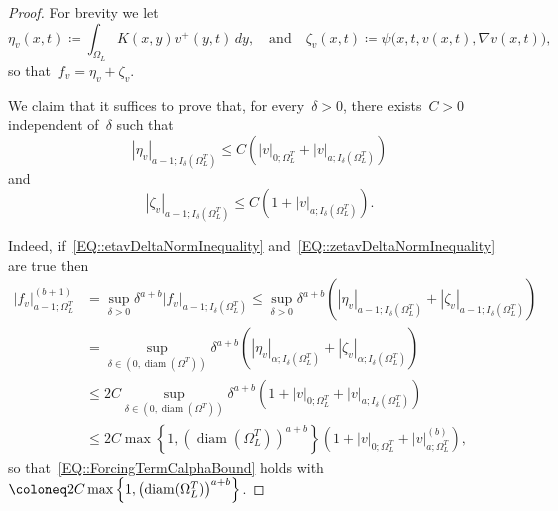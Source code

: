 \documentclass[12pt,a4paper]{amsart}
\makeatletter
\numberwithin{equation}{section}
\theoremstyle{definition}
\theoremstyle{remark}
\newcommand{\abs}[1]{\left\lvert#1\right\rvert}
\renewcommand{\leq}{\leqslant}
\newcommand{\const}[1]{%
  \csname const@#1\endcsname%
}
\makeatother
\begin{document}
\begin{proof}
    For brevity we let
    \begin{equation}\label{EQ::etazetaDefinition}
        \eta_v(x,t) \coloneq \int_{\Omega_L} K(x,y)v^+(y,t)\,dy,\quad \text{and}\quad\zeta_v(x,t) \coloneq \psi\big(x,t,v(x,t),\nabla v(x,t)\big),
    \end{equation}
    so that~$f_v = \eta_v + \zeta_v$.

    We claim that it suffices to prove that, for every~$\delta > 0$, there exists~$C > 0$ independent of~$\delta$ such that
    \begin{equation}\label{EQ::etavDeltaNormInequality}
        \abs{\eta_v}_{a-1; I_\delta(\Omega_L^T)} \leq C \left(\abs{v}_{0; \Omega_L^T} + \abs{v}_{a; I_\delta(\Omega_L^T)}\right)
    \end{equation}
    and
    \begin{equation}\label{EQ::zetavDeltaNormInequality}
        \abs{\zeta_v}_{a-1; I_\delta(\Omega_L^T)} \leq C \left(1 + \abs{v}_{a; I_\delta(\Omega_L^T)}\right).
    \end{equation}

    Indeed, if~\eqref{EQ::etavDeltaNormInequality} and~\eqref{EQ::zetavDeltaNormInequality} are true then
    \begin{align}
        \abs{f_v}_{a-1;\Omega_L^T}^{(b+1)} &= \sup_{\delta > 0} \delta^{a+b}\abs{f_v}_{a-1; I_\delta(\Omega_L^T)} \leq \sup_{\delta >0} \delta^{a+b}\left(\abs{\eta_v}_{a-1; I_\delta(\Omega_L^T)} + \abs{\zeta_v}_{a-1; I_\delta(\Omega_L^T)}\right) \\
            &= \sup_{\delta \in (0,\operatorname{diam}(\Omega^T))} \delta^{a+b}\left(\abs{\eta_v}_{\alpha; I_\delta(\Omega_L^T)} + \abs{\zeta_v}_{\alpha; I_\delta(\Omega_L^T)}\right)\\
            &\leq 2C \sup_{\delta \in (0,\operatorname{diam}(\Omega^T))}\delta^{a+b}\left(1+\abs{v}_{0;\Omega_L^T}+\abs{v}_{a; I_\delta(\Omega_L^T)}\right)\\
            &\leq 2C\max\left\{1,{\left(\operatorname{diam}(\Omega_L^T)\right)}^{a+b}\right\} \left(1+\abs{v}_{0;\Omega_L^T}+\abs{v}_{{a; \Omega_L^T}}^{(b)}\right),
    \end{align}
    so that~\eqref{EQ::ForcingTermCalphaBound} holds with~$\const{CONST::ForcingTermCalphaBound} \coloneq 2C\max\left\{1,{\left(\operatorname{diam}(\Omega_L^T)\right)}^{a+b}\right\}$.


\end{proof}
\end{document}
